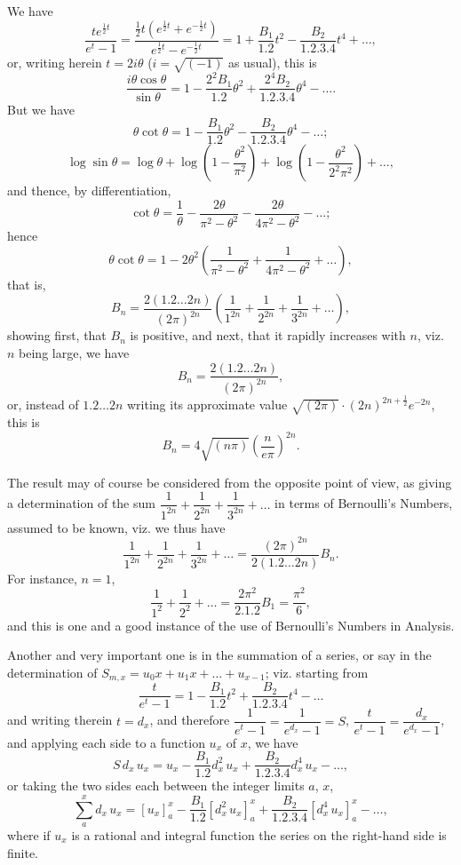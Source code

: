 \documentclass[11pt,a4paper]{book}
\begin{document}
We have
\[
\frac{te^{\frac{1}{2}t}}{e^t-1}
= \frac{\tfrac{1}{2}t(e^{\frac{1}{2}t}+e^{-\frac{1}{2}t})}
         {e^{\frac{1}{2}t}-e^{-\frac{1}{2}t}}
= 1 + \frac{B_1}{1.2}t^2 - \frac{B_2}{1.2.3.4}t^4 + \ldots,
\]
or, writing herein $t=2i\theta$ ($i=\sqrt{(-1)}$ as usual), this is
\[
\frac{i\theta\cos\theta}{\sin\theta}
= 1 - \frac{2^2B_1}{1.2}\theta^2
  + \frac{2^4B_2}{1.2.3.4}\theta^4 - \ldots.
\]
But we have
\[
\theta\cot\theta
= 1 - \frac{B_1}{1.2}\theta^2
  - \frac{B_2}{1.2.3.4}\theta^4 - \ldots;
\]
\[
\log\sin\theta
= \log\theta + \log\left(1-\frac{\theta^2}{\pi^2}\right)
  + \log\left(1-\frac{\theta^2}{2^2\pi^2}\right) + \ldots,
\]
and thence, by differentiation,
\[
\cot\theta
= \frac{1}{\theta}
  - \frac{2\theta}{\pi^2-\theta^2}
  - \frac{2\theta}{4\pi^2-\theta^2} - \ldots;
\]
hence
\[
\theta\cot\theta
= 1 - 2\theta^2\left(\frac{1}{\pi^2-\theta^2}
    + \frac{1}{4\pi^2-\theta^2} + \ldots\right),
\]
that is,
\[
B_n = \frac{2(1.2\ldots 2n)}{(2\pi)^{2n}}
      \left(\frac{1}{1^{2n}} + \frac{1}{2^{2n}} + \frac{1}{3^{2n}} + \ldots\right),
\]
showing first, that $B_n$ is positive, and next, that it rapidly increases
with $n$, viz. $n$ being large, we have
\[
B_n = \frac{2(1.2\ldots 2n)}{(2\pi)^{2n}},
\]
or, instead of $1.2\ldots 2n$ writing its approximate value
$\sqrt{(2\pi)}\cdot(2n)^{2n+\frac{1}{2}}e^{-2n}$, this is
\[
B_n = 4\sqrt{(n\pi)}\left(\frac{n}{e\pi}\right)^{2n}.
\]

\newpage
The result may of course be considered from the opposite point of view, as
giving a determination of the sum
$\dfrac{1}{1^{2n}} + \dfrac{1}{2^{2n}} + \dfrac{1}{3^{2n}} + \ldots$
in terms of Bernoulli's Numbers, assumed to be known, viz. we thus have
\[
\frac{1}{1^{2n}} + \frac{1}{2^{2n}} + \frac{1}{3^{2n}} + \ldots
= \frac{(2\pi)^{2n}}{2(1.2\ldots 2n)}B_n.
\]
For instance, $n=1$,
\[
\frac{1}{1^2} + \frac{1}{2^2} + \ldots
= \frac{2\pi^2}{2.1.2}B_1 = \frac{\pi^2}{6},
\]
and this is one and a good instance of the use of Bernoulli's Numbers in
Analysis.

Another and very important one is in the summation of a series, or say in
the determination of $S_{m,x} = u_0x + u_1x + \ldots + u_{x-1}$; viz.
starting from
\[
\frac{t}{e^t-1}
= 1 - \frac{B_1}{1.2}t^2 + \frac{B_2}{1.2.3.4}t^4 - \ldots
\]
and writing therein $t=d_x$, and therefore $\dfrac{1}{e^t-1}=\dfrac{1}{e^{d_x}-1}=S$,
$\dfrac{t}{e^t-1}=\dfrac{d_x}{e^{d_x}-1}$, and applying each side to a function
$u_x$ of $x$, we have
\[
S\,d_x\,u_x = u_x - \frac{B_1}{1.2}d_x^2\,u_x
  + \frac{B_2}{1.2.3.4}d_x^4\,u_x - \ldots,
\]
or taking the two sides each between the integer limits $a$, $x$,
\[
\sum_a^x d_x\,u_x = [u_x]_a^x - \frac{B_1}{1.2}[d_x^2\,u_x]_a^x
  + \frac{B_2}{1.2.3.4}[d_x^4\,u_x]_a^x - \ldots,
\]
where if $u_x$ is a rational and integral function the series on the
right-hand side is finite.
\end{document}
